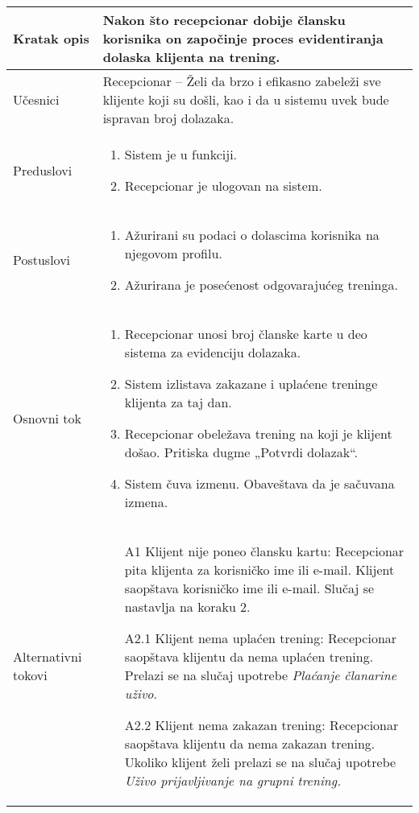 \documentclass[../main.tex]{subfiles}
\begin{document}
\begin{longtable}{| p{} | p{} |} 
\hline
    Kratak opis &  Nakon što recepcionar dobije člansku korisnika on započinje proces evidentiranja dolaska klijenta na trening.\\ 
\hline    
    Učesnici & 
       Recepcionar – Želi da brzo i efikasno zabeleži sve klijente koji su došli, kao i da u sistemu uvek bude ispravan broj dolazaka.   \\
\hline
   Preduslovi & \begin{enumerate}
       \item Sistem je u funkciji.
       \item Recepcionar je ulogovan na sistem.
   \end{enumerate}\\
\hline  
    Postuslovi & \begin{enumerate}
        \item Ažurirani su podaci o dolascima korisnika na njegovom profilu.
        \item Ažurirana je posećenost odgovarajućeg treninga.
    \end{enumerate}\\
\hline
    Osnovni tok & \begin{enumerate}
        \item Recepcionar unosi broj članske karte u deo sistema za evidenciju dolazaka.
        \item Sistem izlistava zakazane i uplaćene treninge klijenta za taj dan.
        \item Recepcionar obeležava trening na koji je klijent došao. Pritiska dugme „Potvrdi dolazak“.
        \item Sistem čuva izmenu. Obaveštava da je sačuvana izmena.
    \end{enumerate}\\
\hline
    Alternativni tokovi & \begin{itemize}
        \item[A1] Klijent nije poneo člansku kartu: Recepcionar pita klijenta za korisničko ime ili e-mail. Klijent saopštava korisničko ime ili e-mail. Slučaj se nastavlja na koraku 2.
        \item[A2.1] Klijent nema uplaćen trening: Recepcionar saopštava klijentu da nema uplaćen trening. Prelazi se na slučaj upotrebe \textit{Plaćanje članarine uživo}.
        \item[A2.2] Klijent nema zakazan trening: Recepcionar saopštava klijentu da nema zakazan trening. Ukoliko klijent želi prelazi se na slučaj upotrebe \textit{Uživo prijavljivanje na grupni trening.} 

\end{itemize}
\end{longtable}
\end{document}
